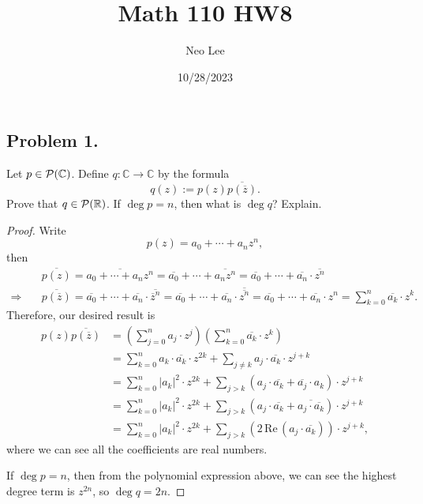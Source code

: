 \documentclass{article}
\title{Math 110 HW8}
\author{Neo Lee}
\date{10/28/2023}
\renewcommand*{\implies}{\ensuremath{\Longrightarrow}}
\newcommand*{\R}{\ensuremath{\mathbb{R}}}
\newcommand*{\C}{\ensuremath{\mathbb{C}}}
\begin{document}
 

\maketitle 

\subsection*{Problem 1.}
Let $p\in {\cal P}(\C)$. Define $q: \C \to \C$ by the formula
$$ q(z):= p(z) \overline{p(\overline{z})}.$$
Prove that $q\in   {\cal P}(\R)$. If $\deg p=n$, then what is $\deg q$? Explain.
\begin{proof}
    Write 
    $$p(z)= a_0 + \cdots + a_nz^n,$$
    then 
    \begin{align*}
        & \overline{p(z)} = \overline{a_0 + \cdots + a_nz^n} = 
        \overline{a_0} + \cdots + \overline{a_nz^n} = \overline{a_0} + \cdots + \overline{a_n}\cdot\overline{z^n} \\
        \implies \quad & \overline{p(\overline{z})} = \overline{a_0} + \cdots + \overline{a_n}\cdot\overline{\overline{z}^n} 
        = \overline{a_0} + \cdots + \overline{a_n}\cdot\overline{\overline{z^n}} 
        = \overline{a_0} + \cdots + \overline{a_n}\cdot z^n 
        = \sum_{k=0}^{n}\overline{a_k}\cdot z^k.
    \end{align*}
    Therefore, our desired result is
    \begin{align*}
        p(z) \overline{p(\overline{z})} &= \left(\sum_{j=0}^{n}a_j\cdot z^j\right)
        \left(\sum_{k=0}^{n}\overline{a_k}\cdot z^k\right) \\
        &= \sum_{k=0}^{n}a_k\cdot \overline{a_k}\cdot z^{2k} + 
        \sum_{j\neq k}a_j\cdot \overline{a_k}\cdot z^{j+k} \\
        & = \sum_{k=0}^{n}|a_k|^2\cdot z^{2k} + \sum_{j>k} (a_j\cdot \overline{a_k}+ 
        \overline{a_j}\cdot a_k)\cdot z^{j+k} \\
        & = \sum_{k=0}^{n}|a_k|^2\cdot z^{2k} + \sum_{j>k} (a_j\cdot \overline{a_k}+ 
        \overline{a_j\cdot \overline{a_k}})\cdot z^{j+k} \\
        & = \sum_{k=0}^{n}|a_k|^2\cdot z^{2k} + \sum_{j>k} \left(2\,\mathrm{Re}\,(a_j\cdot\overline{a_k})\right)\cdot z^{j+k},
    \end{align*}
    where we can see all the coefficients are real numbers.

    If $\deg p = n$, then from the polynomial expression above, we can see the highest 
    degree term is $z^{2n}$, so $\deg q = 2n$.
\end{proof}
\end{document}
